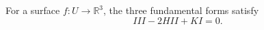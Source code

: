 For a surface $f: U \to \mathbb{R}^3$, the three fundamental forms satisfy
$$III - 2H II + K I = 0.$$